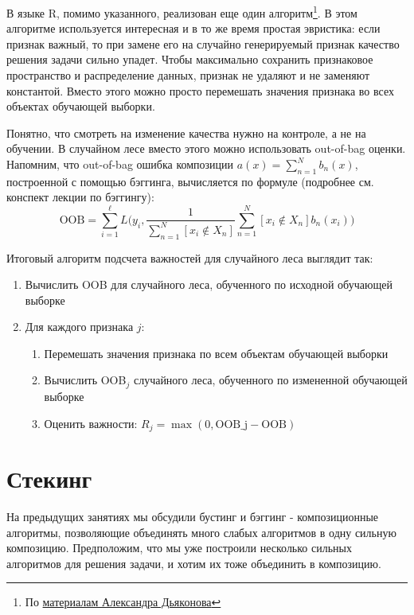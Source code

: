 \documentclass[12pt,a4paper]{article}
\begin{document}
     \par В языке R, помимо указанного, реализован еще один алгоритм\footnote{По \href{http://www.machinelearning.ru/wiki/images/c/cc/PZAD2016_09_rf.pdf}{материалам Александра Дьяконова}}. В этом алгоритме используется интересная и в то же время простая эвристика: если признак важный, то при замене его на случайно генерируемый признак качество решения задачи сильно упадет. Чтобы максимально сохранить признаковое пространство и распределение данных, признак не удаляют и не заменяют константой. Вместо этого можно просто перемешать значения признака во всех объектах обучающей выборки.
     
     Понятно, что смотреть на изменение качества нужно на контроле, а не на обучении. В случайном лесе вместо этого можно использовать  out-of-bag оценки. Напомним, что out-of-bag ошибка композиции $a(x) = \sum_{n=1}^N b_n(x)$, построенной с помощью бэггинга, вычисляется по формуле (подробнее см. конспект лекции по бэггингу):
     \[
     \text{OOB} = \sum_{i=1}^\ell L\biggl(y_i, \frac 1 {\sum_{n=1}^N [x_i \notin X_n]} \sum_{n=1}^N [x_i \notin X_n] b_n(x_i)\biggr)
     \]
     
     Итоговый алгоритм подсчета важностей для случайного леса выглядит так:
     \begin{enumerate}
     	\item Вычислить OOB для случайного леса, обученного по исходной обучающей выборке
     	\item Для каждого признака $j$:
     	\begin{enumerate}
     		\item Перемешать значения признака по всем объектам обучающей выборки
     		\item Вычислить OOB$_j$ случайного леса, обученного по измененной обучающей выборке
     		\item Оценить важности: $R_j = \max(0, \text{OOB_j}-\text{OOB})$
     	\end{enumerate}
     \end{enumerate}
 
    \section{Стекинг}
    На предыдущих занятиях мы обсудили бустинг и бэггинг - композиционные алгоритмы, позволяющие объединять много слабых алгоритмов в одну сильную композицию. Предположим, что мы уже построили несколько сильных алгоритмов для решения задачи, и хотим их тоже объединить в композицию. 
    
\end{document}

